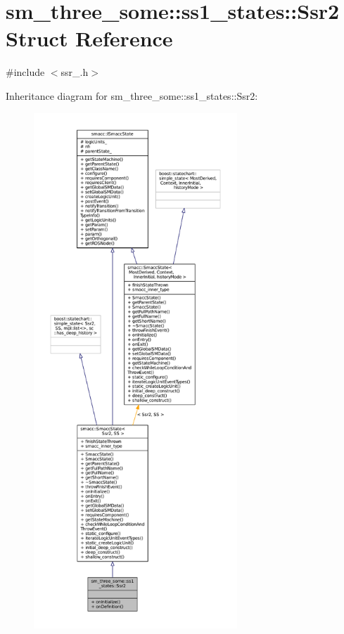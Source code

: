 \hypertarget{structsm__three__some_1_1ss1__states_1_1Ssr2}{}\section{sm\+\_\+three\+\_\+some\+:\+:ss1\+\_\+states\+:\+:Ssr2 Struct Reference}
\label{structsm__three__some_1_1ss1__states_1_1Ssr2}


{\ttfamily \#include $<$ssr\+\_.\+h$>$}



Inheritance diagram for sm\+\_\+three\+\_\+some\+:\+:ss1\+\_\+states\+:\+:Ssr2\+:
\nopagebreak
\begin{figure}[H]
\begin{center}
\leavevmode
\includegraphics[height=550pt]{structsm__three__some_1_1ss1__states_1_1Ssr2__inherit__graph}
\end{center}
\end{figure}


